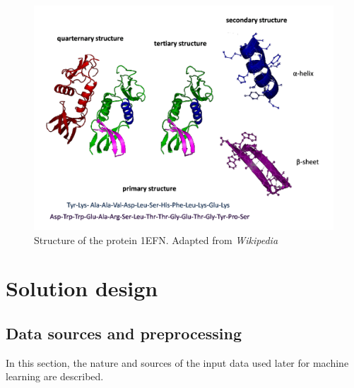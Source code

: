 \documentclass[11pt,twoside,a4paper]{book}
\begin{document}
\begin{landscape}
\begin{figure}[h]
\begin{center}
\includegraphics[width=21cm]{figures/Protein_structure}
\caption{Structure of the protein 1EFN. Adapted from \emph{Wikipedia}}
\label{fig:Protein_structure}
\end{center}
\end{figure}
\end{landscape}



\chapter{Solution design}

\section{Data sources and preprocessing}
In this section, the nature and sources of the input data used later for machine learning are described.
\end{document}
